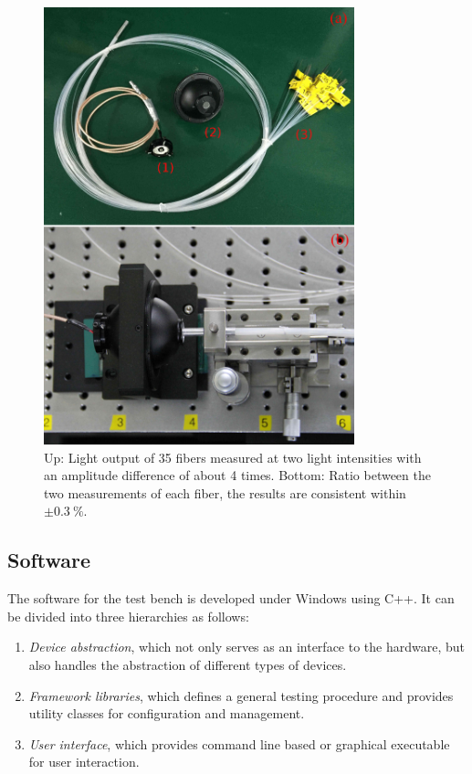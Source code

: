\documentclass{JINST}
\begin{document}
\begin{figure}[tbp]
	\centering
	\includegraphics[width=90mm]{FIG3}
	\caption{Up: Light output of 35 fibers measured at two light intensities with an amplitude difference of about 4 times.
		Bottom: Ratio between the two measurements of each fiber, the results are consistent within $\pm\SI{0.3}{\percent}$.}
	\label{fig:FIG3}
\end{figure} 
	
\subsection{Software}
\label{sec:software}
	
The software for the test bench is developed under Windows using C++. It can be divided into three hierarchies as follows:
\begin{enumerate}
	\item \textit{Device abstraction}, which not only serves as an interface to the hardware, but also handles the abstraction of different types of devices. 
	\item \textit{Framework libraries}, which defines a general testing procedure and provides utility classes for configuration and management.
	\item \textit{User interface}, which provides command line based or graphical executable for user interaction. 
\end{enumerate}
	
\end{document}

